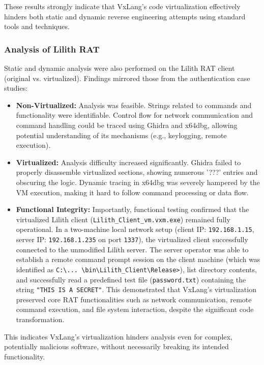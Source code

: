 These results strongly indicate that VxLang's code virtualization effectively hinders both static and dynamic reverse engineering attempts using standard tools and techniques.

\subsubsection{Analysis of Lilith RAT}
Static and dynamic analysis were also performed on the Lilith RAT client (original vs. virtualized). Findings mirrored those from the authentication case studies:
\begin{itemize}
    \item \textbf{Non-Virtualized:} Analysis was feasible. Strings related to commands and functionality were identifiable. Control flow for network communication and command handling could be traced using Ghidra and x64dbg, allowing potential understanding of its mechanisms (e.g., keylogging, remote execution).
    \item \textbf{Virtualized:} Analysis difficulty increased significantly. Ghidra failed to properly disassemble virtualized sections, showing numerous '???' entries and obscuring the logic. Dynamic tracing in x64dbg was severely hampered by the VM execution, making it hard to follow command processing or data flow.
    \item \textbf{Functional Integrity:} Importantly, functional testing confirmed that the virtualized Lilith client (\texttt{Lilith\_Client\_vm.vxm.exe}) remained fully operational. In a two-machine local network setup (client IP: \texttt{192.168.1.15}, server IP: \texttt{192.168.1.235} on port \texttt{1337}), the virtualized client successfully connected to the unmodified Lilith server. The server operator was able to establish a remote command prompt session on the client machine (which was identified as \texttt{C:\textbackslash{}... \textbackslash{}bin\textbackslash{}Lilith\_Client\textbackslash{}Release>}), list directory contents, and successfully read a predefined test file (\texttt{password.txt}) containing the string \texttt{"THIS IS A SECRET"}. This demonstrated that VxLang's virtualization preserved core RAT functionalities such as network communication, remote command execution, and file system interaction, despite the significant code transformation.
\end{itemize}
This indicates VxLang's virtualization hinders analysis even for complex, potentially malicious software, without necessarily breaking its intended functionality.

